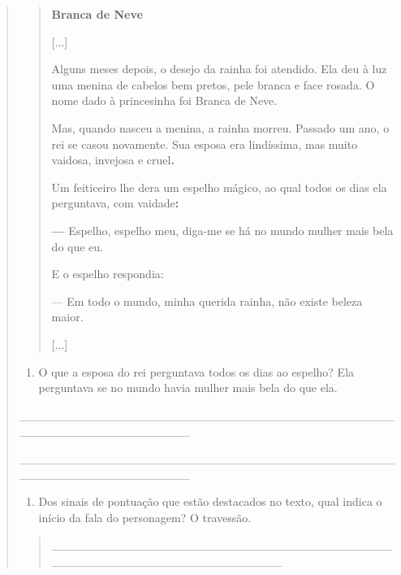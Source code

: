 \begin{boxlist}
\begin{quote}
\begin{iteize}
{\begin{quote}
\textbf{Branca de Neve}

{[}...{]}

Alguns meses depois, o desejo da rainha foi atendido. Ela deu à luz uma
menina de cabelos bem pretos, pele branca e face rosada. O nome dado à
princesinha foi Branca de Neve.

Mas, quando nasceu a menina, a rainha morreu. Passado um ano, o rei se
casou novamente. Sua esposa era lindíssima, mas muito vaidosa, invejosa
e cruel\textbf{.}

Um feiticeiro lhe dera um espelho mágico, ao qual todos os dias ela
perguntava, com vaidade\textbf{:}

\textbf{---} Espelho, espelho meu, diga-me se há no mundo mulher mais bela do que
eu.

E o espelho respondia:

--- Em todo o mundo, minha querida rainha, não existe beleza maior.

{[}...{]}

\end{quote}

\begin{enumerate}
\def\labelenumi{\alph{enumi})}
\item
  O que a esposa do rei perguntava todos os dias ao espelho? Ela
  perguntava se no mundo havia mulher mais bela do que ela.
\end{enumerate}

\_\_\_\_\_\_\_\_\_\_\_\_\_\_\_\_\_\_\_\_\_\_\_\_\_\_\_\_\_\_\_\_\_\_\_\_\_\_\_\_\_\_\_\_\_\_\_\_\_\_\_\_\_\_\_\_\_\_\_\_\_\_\_\_

\_\_\_\_\_\_\_\_\_\_\_\_\_\_\_\_\_\_\_\_\_\_\_\_\_\_\_\_\_\_\_\_\_\_\_\_\_\_\_\_\_\_\_\_\_\_\_\_\_\_\_\_\_\_\_\_\_\_\_\_\_\_\_\_

\begin{enumerate}
\def\labelenumi{\alph{enumi})}
\item
  Dos sinais de pontuação que estão destacados no texto, qual indica o
  início da fala do personagem? O travessão.
\end{enumerate}

\begin{quote}
\protect\hypertarget{_Hlk127463829}{}{}\_\_\_\_\_\_\_\_\_\_\_\_\_\_\_\_\_\_\_\_\_\_\_\_\_\_\_\_\_\_\_\_\_\_\_\_\_\_\_\_\_\_\_\_\_\_\_\_\_\_\_\_\_\_\_\_\_\_\_\_\_\_\_\_\_\_\_


\end{quote}}
\end{iteize}
\end{quote}
\end{boxlist}
